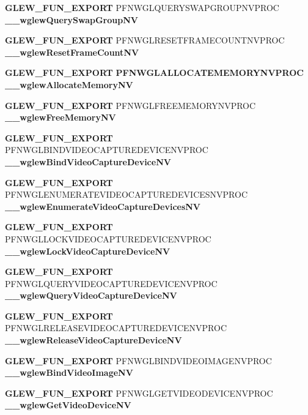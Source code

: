 \begin{DoxyCompactItemize}
\item 
{\bf G\+L\+E\+W\+\_\+\+F\+U\+N\+\_\+\+E\+X\+P\+O\+RT} P\+F\+N\+W\+G\+L\+Q\+U\+E\+R\+Y\+S\+W\+A\+P\+G\+R\+O\+U\+P\+N\+V\+P\+R\+OC {\bf \+\_\+\+\_\+wglew\+Query\+Swap\+Group\+NV}
\item 
{\bf G\+L\+E\+W\+\_\+\+F\+U\+N\+\_\+\+E\+X\+P\+O\+RT} P\+F\+N\+W\+G\+L\+R\+E\+S\+E\+T\+F\+R\+A\+M\+E\+C\+O\+U\+N\+T\+N\+V\+P\+R\+OC {\bf \+\_\+\+\_\+wglew\+Reset\+Frame\+Count\+NV}
\item 
{\bf G\+L\+E\+W\+\_\+\+F\+U\+N\+\_\+\+E\+X\+P\+O\+RT} {\bf P\+F\+N\+W\+G\+L\+A\+L\+L\+O\+C\+A\+T\+E\+M\+E\+M\+O\+R\+Y\+N\+V\+P\+R\+OC} {\bf \+\_\+\+\_\+wglew\+Allocate\+Memory\+NV}
\item 
{\bf G\+L\+E\+W\+\_\+\+F\+U\+N\+\_\+\+E\+X\+P\+O\+RT} P\+F\+N\+W\+G\+L\+F\+R\+E\+E\+M\+E\+M\+O\+R\+Y\+N\+V\+P\+R\+OC {\bf \+\_\+\+\_\+wglew\+Free\+Memory\+NV}
\item 
{\bf G\+L\+E\+W\+\_\+\+F\+U\+N\+\_\+\+E\+X\+P\+O\+RT} P\+F\+N\+W\+G\+L\+B\+I\+N\+D\+V\+I\+D\+E\+O\+C\+A\+P\+T\+U\+R\+E\+D\+E\+V\+I\+C\+E\+N\+V\+P\+R\+OC {\bf \+\_\+\+\_\+wglew\+Bind\+Video\+Capture\+Device\+NV}
\item 
{\bf G\+L\+E\+W\+\_\+\+F\+U\+N\+\_\+\+E\+X\+P\+O\+RT} P\+F\+N\+W\+G\+L\+E\+N\+U\+M\+E\+R\+A\+T\+E\+V\+I\+D\+E\+O\+C\+A\+P\+T\+U\+R\+E\+D\+E\+V\+I\+C\+E\+S\+N\+V\+P\+R\+OC {\bf \+\_\+\+\_\+wglew\+Enumerate\+Video\+Capture\+Devices\+NV}
\item 
{\bf G\+L\+E\+W\+\_\+\+F\+U\+N\+\_\+\+E\+X\+P\+O\+RT} P\+F\+N\+W\+G\+L\+L\+O\+C\+K\+V\+I\+D\+E\+O\+C\+A\+P\+T\+U\+R\+E\+D\+E\+V\+I\+C\+E\+N\+V\+P\+R\+OC {\bf \+\_\+\+\_\+wglew\+Lock\+Video\+Capture\+Device\+NV}
\item 
{\bf G\+L\+E\+W\+\_\+\+F\+U\+N\+\_\+\+E\+X\+P\+O\+RT} P\+F\+N\+W\+G\+L\+Q\+U\+E\+R\+Y\+V\+I\+D\+E\+O\+C\+A\+P\+T\+U\+R\+E\+D\+E\+V\+I\+C\+E\+N\+V\+P\+R\+OC {\bf \+\_\+\+\_\+wglew\+Query\+Video\+Capture\+Device\+NV}
\item 
{\bf G\+L\+E\+W\+\_\+\+F\+U\+N\+\_\+\+E\+X\+P\+O\+RT} P\+F\+N\+W\+G\+L\+R\+E\+L\+E\+A\+S\+E\+V\+I\+D\+E\+O\+C\+A\+P\+T\+U\+R\+E\+D\+E\+V\+I\+C\+E\+N\+V\+P\+R\+OC {\bf \+\_\+\+\_\+wglew\+Release\+Video\+Capture\+Device\+NV}
\item 
{\bf G\+L\+E\+W\+\_\+\+F\+U\+N\+\_\+\+E\+X\+P\+O\+RT} P\+F\+N\+W\+G\+L\+B\+I\+N\+D\+V\+I\+D\+E\+O\+I\+M\+A\+G\+E\+N\+V\+P\+R\+OC {\bf \+\_\+\+\_\+wglew\+Bind\+Video\+Image\+NV}
\item 
{\bf G\+L\+E\+W\+\_\+\+F\+U\+N\+\_\+\+E\+X\+P\+O\+RT} P\+F\+N\+W\+G\+L\+G\+E\+T\+V\+I\+D\+E\+O\+D\+E\+V\+I\+C\+E\+N\+V\+P\+R\+OC {\bf \+\_\+\+\_\+wglew\+Get\+Video\+Device\+NV}

\end{DoxyCompactItemize}
